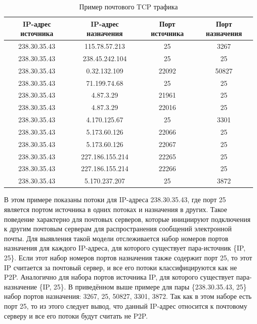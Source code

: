 \documentclass[bachelor, och, coursework]{SCWorks}
\begin{document}
\begin{table}[H]
    \caption{Пример почтового TCP трафика}
    \label{table:mail}
    \begin{center}
    {\small
    \begin{tabular}{|c|c|c|c|}
        \hline
    IP-адрес источника & IP-адрес назначения & Порт источника & Порт назначения \\ \hline
    238.30.35.43       &   115.78.57.213     & 25             & 3267 \\ \hline
    238.30.35.43       &    238.45.242.104   & 25             & 25 \\ \hline
    238.30.35.43       &    0.32.132.109     & 22092          & 50827 \\ \hline
    238.30.35.43       &    71.199.74.68     & 25             & 25 \\ \hline
    238.30.35.43       &    4.87.3.29        & 21961          & 25 \\ \hline
    238.30.35.43       &     4.87.3.29       & 22016          & 25 \\ \hline
    238.30.35.43       &     4.170.125.67    & 25             & 3301\\ \hline
    238.30.35.43       &     5.173.60.126    & 22066          & 25 \\ \hline
    238.30.35.43       &     5.173.60.126    & 22067          & 25 \\ \hline
    238.30.35.43       &     227.186.155.214 & 22265          & 25 \\ \hline
    238.30.35.43       &    227.186.155.214  & 22266          & 25\\ \hline
    238.30.35.43       &     5.170.237.207   & 25             & 3872 \\ \hline
    \end{tabular}
    }
    \end{center}
\end{table}

В этом примере показаны потоки для IP-адреса 238.30.35.43, где порт 25 является портом источника в одних потоках и назначения в других. Такое поведение характерно для почтовых серверов, которые инициируют подключения к другим почтовым серверам для распространения сообщений электронной почты. Для выявления такой модели отслеживается набор номеров портов назначения для каждого IP-адреса, для которого существует пара-источник \{IP, 25\}. Если этот набор номеров портов назначения также содержит порт 25, то этот IP считается за почтовый сервер, и все его потоки классифицируются как не P2P. Аналогично для набора портов источника IP, для которого существует пара-назначение \{IP, 25\}. В приведённом выше примере для пары \{238.30.35.43, 25\} набор портов назначения: 3267, 25, 50827, 3301, 3872. Так как в этом наборе есть порт 25, то из этого следует вывод, что данный IP-адрес относится к почтовому серверу и все его потоки будут считать не P2P.
\end{document}
